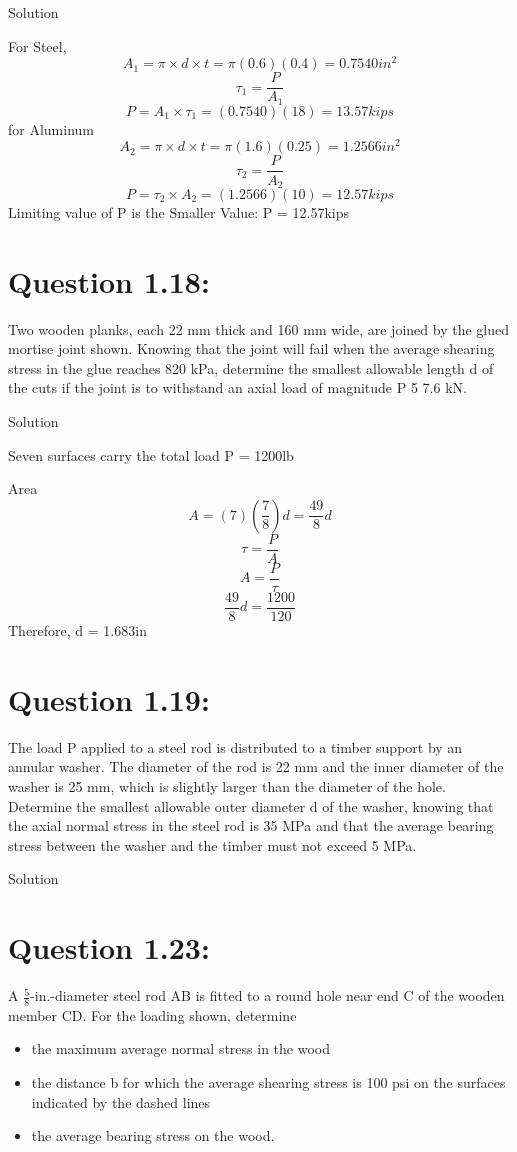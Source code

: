 \documentclass{article}
\begin{document}
\begin{center} Solution \end{center}
For Steel, 
\[A_{1} = \pi \times d\times t= \pi (0.6)(0.4) = 0.7540in^{2}\]
\[\tau_{1} = \frac{P}{A_{1}}\]
\[P = A_{1}\times\tau_{1} = (0.7540)(18) = 13.57kips\]
for Aluminum 
\[A_{2} = \pi\times d\times t = \pi(1.6)(0.25) = 1.2566in^{2}\]
\[\tau_{2} = \frac{P}{A_{2}}\]
\[P= \tau_{2} \times A_{2} = (1.2566)(10)= 12.57kips\]
Limiting value of P is the Smaller Value: P = 12.57kips


\section*{\textbf{Question 1.18:}}

Two wooden planks, each 22 mm thick and 160 mm wide, are joined by the glued mortise joint shown. Knowing that the joint
will fail when the average shearing stress in the glue reaches 820 kPa, determine the smallest allowable length d of the cuts if
the joint is to withstand an axial load of magnitude P 5 7.6 kN.

\begin{center} Solution \end{center}
Seven surfaces carry the total load P = 1200lb

Area \[A = (7)(\frac{7}{8})d = \frac{49}{8}d\]
\[\tau = \frac{P}{A}\]
\[A = \frac{P}{\tau}\]
\[\frac{49}{8}d = \frac{1200}{120} \]
Therefore, d = 1.683in

\section*{\textbf{Question 1.19:}}
The load P applied to a steel rod is distributed to a timber support by an annular washer. The diameter of the rod is 22 mm and the
inner diameter of the washer is 25 mm, which is slightly larger than the diameter of the hole. Determine the smallest allowable
outer diameter d of the washer, knowing that the axial normal stress in the steel rod is 35 MPa and that the average bearing stress between the washer and the timber must not exceed 5 MPa.

 \begin{center} Solution \end{center}



\section*{\textbf{Question 1.23:}}
 A $\frac{5}{8}$-in.-diameter steel rod AB is fitted to a round hole near end C of the wooden member CD. For the loading shown, determine
\begin{itemize}	
 	\item the maximum average normal stress in the wood
	\item the distance b for which the average shearing stress is 100 psi on the surfaces indicated by the dashed lines
	\item the average bearing stress on the wood.
\end{itemize}
\end{document}

